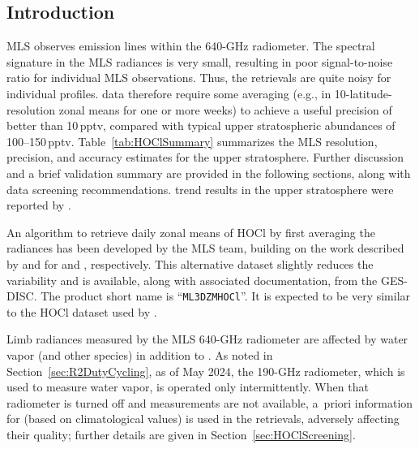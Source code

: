 
\subsection{Introduction}

MLS observes  emission lines within the \mbox{640-GHz} radiometer. The  spectral signature in the MLS radiances is very small, resulting in poor signal-to-noise ratio for individual MLS observations. Thus, the  retrievals are quite noisy for individual profiles.  data therefore require some averaging (e.g., in 10\degsym{}-latitude-resolution zonal means for one or more weeks) to achieve a useful precision of better than 10\,pptv, compared with typical upper stratospheric  abundances of 100--150\,pptv. Table~\ref{tab:HOClSummary} summarizes the MLS  resolution, precision, and accuracy estimates for the upper stratosphere. Further discussion and a brief validation summary are provided in the following sections, along with data screening recommendations.  trend results in the upper stratosphere were reported by \cite{FroidevauxEtal:2022:HOCl}.



An algorithm to retrieve daily zonal means of HOCl by first averaging the radiances has been developed by the MLS team, building on the work described by \citet{MillanEtal:2012} and \citet{MillanEtal:2015} for  and , respectively. This alternative dataset slightly reduces the variability and is available, along with associated documentation, from the GES-DISC\@. The product short name is ``\texttt{ML3DZMHOCl}''. It is expected to be very similar to the HOCl dataset used by \cite{FroidevauxEtal:2022:HOCl}. 

Limb radiances measured by the MLS \mbox{640-GHz} radiometer are affected by water vapor (and other species) in addition to . As noted in Section~\ref{sec:R2DutyCycling}, as of May 2024, the \mbox{190-GHz} radiometer, which is used to measure water vapor, is operated only intermittently. When that radiometer is turned off and  measurements are not available, a~priori information for  (based on climatological values) is used in the  retrievals, adversely affecting their quality; further details are given in Section~\ref{sec:HOClScreening}. 


